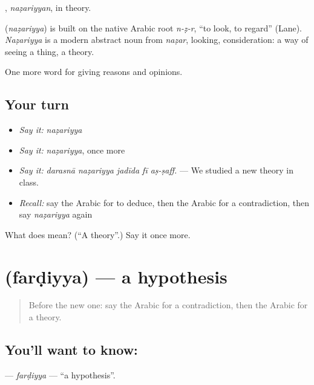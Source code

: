 , \emph{naẓariyyan}, in theory.

\begin{cousinweb}
\textbf{} (\emph{naẓariyya}) is built on the native Arabic root \emph{n-ẓ-r}, \textquotedblleft{}to look, to regard\textquotedblright{} (Lane). \emph{Naẓariyya} is a modern abstract noun from \emph{naẓar}, looking, consideration: a way of seeing a thing, a theory.
\end{cousinweb}

\begin{grammarlens}[title={What you've built}]
One more word for giving reasons and opinions.
\end{grammarlens}

\subsection*{Your turn}
\begin{itemize}
\raggedright
  \item \emph{Say it:} \emph{naẓariyya}
  \item \emph{Say it:} \emph{naẓariyya}, once more
  \item \emph{Say it:} \emph{darasnā naẓariyya jadīda fī aṣ-ṣaff.} — We studied a new theory in class.
  \item \emph{Recall:} say the Arabic for to deduce, then the Arabic for a contradiction, then say \emph{naẓariyya} again
\end{itemize}

\begin{tcolorbox}[breakable,colback=teal!4,colframe=teal!35!black,title={Before you move on}]
What does  mean? (\textquotedblleft{}A theory\textquotedblright{}.) Say it once more.
\end{tcolorbox}
\section[\texorpdfstring{\ar{فرضية} (farḍiyya)}{فرضية (farḍiyya)}]{ (farḍiyya) — a hypothesis}

\label{lesson:AR-C363-fardiyya}



\begin{quote}
Before the new one: say the Arabic for a contradiction, then the Arabic for a theory.
\end{quote}

\subsection*{You'll want to know: }
\textbf{} — \emph{farḍiyya} — \textquotedblleft{}a hypothesis\textquotedblright{}.

